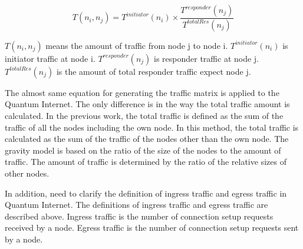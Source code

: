 \begin{screen}
    \begin{dfn}
        \begin{equation}
            T(n_i,n_j) = T^{initiator}(n_i) \times \frac{T^{responder}(n_j)}{T^{totalRes}(n_j)}
        \end{equation}
    \end{dfn}
\end{screen}

$T(n_i,n_j)$ means the amount of traffic from node j to node i. 
$T^{initiator}(n_i)$ is initiator traffic at node i.
$T^{responder}(n_j)$ is responder traffic at node j.
$T^{totalRes}(n_j)$ is the amount of total responder traffic expect node j.

The almost same equation for generating the traffic matrix is applied to the Quantum Internet.
The only difference is in the way the total traffic amount is calculated.
In the previous work, the total traffic is defined as the sum of the traffic of all the nodes including the own node.
In this method, the total traffic is calculated as the sum of the traffic of the nodes other than the own node.
The gravity model is based on the ratio of the size of the nodes to the amount of traffic. 
The amount of traffic is determined by the ratio of the relative sizes of other nodes.

In addition, need to clarify the definition of ingress traffic and egress traffic in Quantum Internet.
The definitions of ingress traffic and egress traffic are described above. 
Ingress traffic is the number of connection setup requests received by a node. 
Egress traffic is the number of connection setup requests sent by a node.

